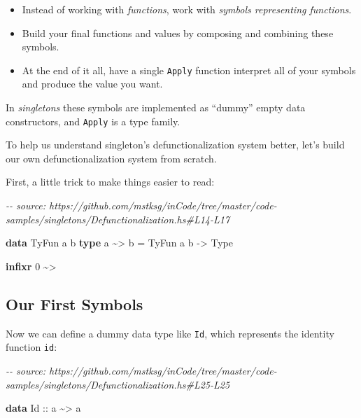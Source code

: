 \documentclass[]{article}
\newenvironment{Shaded}{}{}
\newcommand{\CommentTok}[1]{\textcolor[rgb]{0.38,0.63,0.69}{\textit{#1}}}
\newcommand{\DataTypeTok}[1]{\textcolor[rgb]{0.56,0.13,0.00}{#1}}
\newcommand{\DecValTok}[1]{\textcolor[rgb]{0.25,0.63,0.44}{#1}}
\newcommand{\KeywordTok}[1]{\textcolor[rgb]{0.00,0.44,0.13}{\textbf{#1}}}
\newcommand{\NormalTok}[1]{#1}
\newcommand{\OperatorTok}[1]{\textcolor[rgb]{0.40,0.40,0.40}{#1}}
\newcommand{\OtherTok}[1]{\textcolor[rgb]{0.00,0.44,0.13}{#1}}
\begin{document}
\begin{itemize}
\tightlist
\item
  Instead of working with \emph{functions}, work with \emph{symbols representing
  functions}.
\item
  Build your final functions and values by composing and combining these
  symbols.
\item
  At the end of it all, have a single \texttt{Apply} function interpret all of
  your symbols and produce the value you want.
\end{itemize}

In \emph{singletons} these symbols are implemented as ``dummy'' empty data
constructors, and \texttt{Apply} is a type family.

To help us understand singleton's defunctionalization system better, let's build
our own defunctionalization system from scratch.

First, a little trick to make things easier to read:

\begin{Shaded}
\begin{Highlighting}[]
\CommentTok{{-}{-} source: https://github.com/mstksg/inCode/tree/master/code{-}samples/singletons/Defunctionalization.hs\#L14{-}L17}

\KeywordTok{data} \DataTypeTok{TyFun}\NormalTok{ a b}
\KeywordTok{type}\NormalTok{ a }\OperatorTok{\textasciitilde{}>}\NormalTok{ b }\OtherTok{=} \DataTypeTok{TyFun}\NormalTok{ a b }\OtherTok{{-}>} \DataTypeTok{Type}

\KeywordTok{infixr} \DecValTok{0} \OperatorTok{\textasciitilde{}>}
\end{Highlighting}
\end{Shaded}

\hypertarget{our-first-symbols}{%
\subsection{Our First Symbols}\label{our-first-symbols}}

Now we can define a dummy data type like \texttt{Id}, which represents the
identity function \texttt{id}:

\begin{Shaded}
\begin{Highlighting}[]
\CommentTok{{-}{-} source: https://github.com/mstksg/inCode/tree/master/code{-}samples/singletons/Defunctionalization.hs\#L25{-}L25}

\KeywordTok{data} \DataTypeTok{Id}\OtherTok{ ::}\NormalTok{ a }\OperatorTok{\textasciitilde{}>}\NormalTok{ a}
\end{Highlighting}
\end{Shaded}
\end{document}
